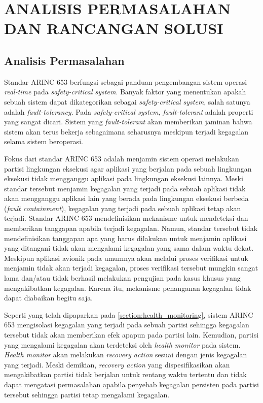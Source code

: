\chapter{ANALISIS PERMASALAHAN DAN RANCANGAN SOLUSI}

\section{Analisis Permasalahan}
\label{section:permasalahan}

Standar ARINC 653 berfungsi sebagai panduan pengembangan sistem operasi \textit{real-time} pada
\textit{safety-critical system}. Banyak faktor yang menentukan apakah sebuah sistem dapat
dikategorikan sebagai \textit{safety-critical system}, salah satunya adalah
\textit{fault-tolerancy}.  Pada \textit{safety\hyp critical system}, \textit{fault-tolerant}
adalah properti yang sangat dicari. Sistem yang \textit{fault-tolerant} akan memberikan jaminan
bahwa sistem akan terus bekerja sebagaimana seharusnya meskipun terjadi kegagalan selama
sistem beroperasi.

Fokus dari standar ARINC 653 adalah menjamin sistem operasi melakukan partisi lingkungan
eksekusi agar aplikasi yang berjalan pada sebuah lingkungan eksekusi tidak mengganggu aplikasi
pada lingkungan eksekusi lainnya. Meski standar tersebut menjamin kegagalan yang terjadi pada
sebuah aplikasi tidak akan mengganggu aplikasi lain yang berada pada lingkungan eksekusi berbeda
(\textit{fault containment}), kegagalan yang terjadi pada sebuah aplikasi tetap akan terjadi.
Standar ARINC 653 mendefinisikan mekanisme untuk mendeteksi dan memberikan tanggapan apabila
terjadi kegagalan. Namun, standar tersebut tidak mendefinisikan tanggapan apa yang harus
dilakukan untuk menjamin aplikasi yang ditangani tidak akan mengalami kegagalan yang sama dalam
waktu dekat. Meskipun aplikasi avionik pada umumnya akan melalui proses verifikasi untuk
menjamin tidak akan terjadi kegagalan, proses verifikasi tersebut mungkin sangat lama dan/atau
tidak berhasil melakukan pengujian pada kasus khusus yang mengakibatkan kegagalan. Karena itu,
mekanisme penanganan kegagalan tidak dapat diabaikan begitu saja.

Seperti yang telah dipaparkan pada \autoref{section:health_monitoring}, sistem ARINC 653
mengisolasi kegagalan yang terjadi pada sebuah partisi sehingga kegagalan tersebut tidak akan
memberikan efek apapun pada partisi lain. Kemudian, partisi yang mengalami kegagalan akan
terdeteksi oleh \textit{health monitor} pada sistem. \textit{Health monitor} akan melakukan
\textit{recovery action} sesuai dengan jenis kegagalan yang terjadi. Meski demikian,
\textit{recovery action} yang dispesifikasikan akan mengakibatkan partisi tidak berjalan untuk
rentang waktu tertentu dan tidak dapat mengatasi permasalahan apabila penyebab kegagalan
persisten pada partisi tersebut sehingga partisi tetap mengalami kegagalan.

